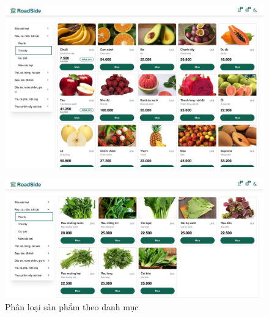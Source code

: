 \begin{figure}[H]
    \centering
    \includegraphics[width=1\linewidth] {Images/UI/categories4.png}
\end{figure}
\begin{figure}[H]
    \centering
    \includegraphics[width=1\linewidth] {Images/UI/categories6.png}
    \vspace{1em}
    \caption{Phân loại sản phẩm theo danh mục}
\end{figure}
